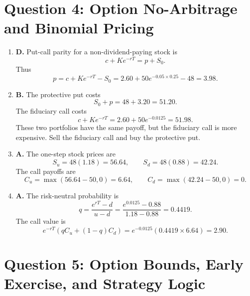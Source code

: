 \documentclass[11pt]{article}
\begin{document}
\section*{Question 4: Option No-Arbitrage and Binomial Pricing}

\begin{enumerate}[label=\textbf{4.\arabic*.}]
    \item \textbf{D.} Put-call parity for a non-dividend-paying stock is
    \[
        c+Ke^{-rT}=p+S_0.
    \]
    Thus
    \[
        p=c+Ke^{-rT}-S_0
        =2.60+50e^{-0.05\times0.25}-48
        =3.98.
    \]

    \item \textbf{B.} The protective put costs
    \[
        S_0+p=48+3.20=51.20.
    \]
    The fiduciary call costs
    \[
        c+Ke^{-rT}=2.60+50e^{-0.0125}=51.98.
    \]
    These two portfolios have the same payoff, but the fiduciary call is more
    expensive. Sell the fiduciary call and buy the protective put.

    \item \textbf{A.} The one-step stock prices are
    \[
        S_u=48(1.18)=56.64,\qquad S_d=48(0.88)=42.24.
    \]
    The call payoffs are
    \[
        C_u=\max(56.64-50,0)=6.64,\qquad
        C_d=\max(42.24-50,0)=0.
    \]

    \item \textbf{A.} The risk-neutral probability is
    \[
        q=\frac{e^{rT}-d}{u-d}
        =\frac{e^{0.0125}-0.88}{1.18-0.88}
        =0.4419.
    \]
    The call value is
    \[
        e^{-rT}\left(qC_u+(1-q)C_d\right)
        =e^{-0.0125}(0.4419\times6.64)
        =2.90.
    \]
\end{enumerate}

\section*{Question 5: Option Bounds, Early Exercise, and Strategy Logic}
\end{document}

